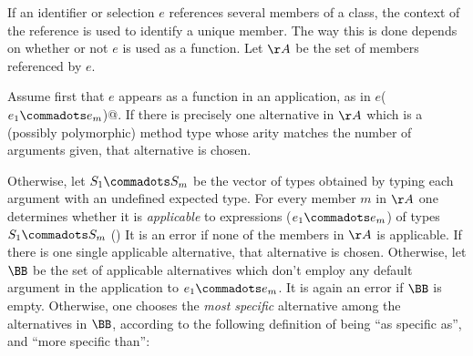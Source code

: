If an identifier or selection $e$ references several members of a
class, the context of the reference is used to identify a unique
member.  The way this is done depends on whether or not $e$ is used as
a function. Let $\AA$ be the set of members referenced by $e$.

Assume first that $e$ appears as a function in an application, as in
\lstinline@$e$($e_1 \commadots e_m$)@.  If there is precisely one
alternative in $\AA$ which is a (possibly polymorphic) method type
whose arity matches the number of arguments given, that alternative is
chosen.

Otherwise, let $S_1 \commadots S_m$ be the vector of types obtained by
typing each argument with an undefined expected type.  For every
member $m$ in $\AA$ one determines whether it is {\em
applicable} to expressions ($e_1 \commadots e_m$) of types $S_1
\commadots S_m$ ()
It is an error if none of the members in $\AA$ is applicable. If there is one
single applicable alternative, that alternative is chosen. Otherwise, let $\BB$
be the set of applicable alternatives which don't employ any default argument
in the application to $e_1 \commadots e_m$. It is again an error if $\BB$ is empty.
Otherwise, one chooses the {\em most specific} alternative among the alternatives
in $\BB$, according to the following definition of being ``as specific as'', and
``more specific than'':



